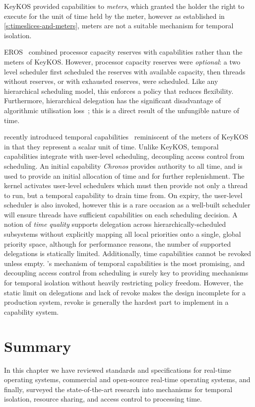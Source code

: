 KeyKOS provided capabilities to \emph{meters}, which granted the holder
the right to execute for the unit of time held by the meter, however as established in 
\cref{s:timeslices-and-meters}, meters are not a suitable mechanism for temporal isolation.

EROS~\citep{Shapiro_SF_99} combined processor capacity reserves with capabilities rather than the
meters of KeyKOS.
However, processor capacity reserves were \emph{optional}: a two level scheduler first
scheduled the reserves with available capacity, then threads without reserves,
or with exhausted reserves, were scheduled.
Like any hierarchical scheduling model, this enforces a policy that
reduces flexibility.
Furthermore, hierarchical delegation has the significant disadvantage
of algorithmic utilisation loss~\citep{Lackorzynski_WVH_12}; this is a
direct result of the unfungible nature of time.

\composite recently introduced temporal capabilities~\citep{Gadepalli_GBKP_17} reminiscent of
the meters of KeyKOS in that they represent a scalar unit of time. 
Unlike KeyKOS, temporal capabilities integrate with user-level scheduling, decoupling access control
from scheduling. An initial capability \emph{Chronos} provides authority to all time, and is used to
provide an initial allocation of time and for further replenishment. 
The kernel activates user-level schedulers 
which must then provide not only a thread to run, but a temporal capability to drain time from.
On expiry, the user-level scheduler is also
invoked, however this is a rare occasion as a well-built scheduler will ensure threads have
sufficient capabilities on each scheduling decision.
 A notion of \emph{time quality} supports delegation across
hierarchically-scheduled subsystems without explicitly mapping all
local priorities onto a single, global priority space, although for performance reasons, the number
of supported delegations is statically limited.
Additionally, time capabilities cannot be revoked unless empty. 
\composite's mechanism of temporal capabilities is the most promising, and decoupling access
control from scheduling is surely key to providing mechanisms for temporal isolation without 
heavily restricting policy freedom. However, the static limit on delegations and lack of revoke
makes the design incomplete for a production system, revoke is generally the hardest part to
implement in a capability system. 

\section{Summary}
In this chapter we have reviewed standards and specifications for real-time operating systems,
commercial and open-source real-time operating systems, and finally, surveyed the state-of-the-art
research into mechanisms for temporal isolation, resource sharing, and access control to processing
time.


